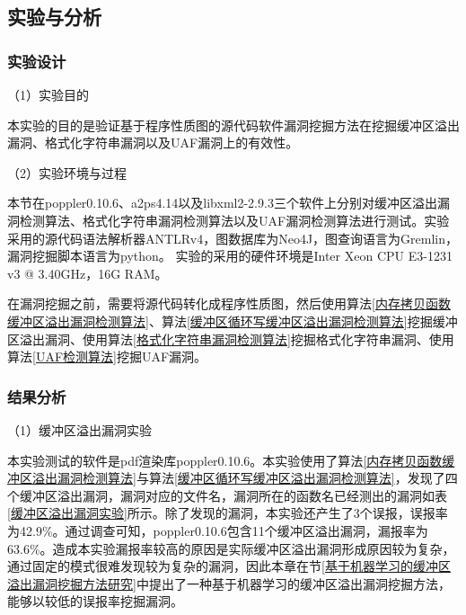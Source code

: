 {%

\subsection{实验与分析}

\subsubsection{实验设计}
（1）实验目的

本实验的目的是验证基于程序性质图的源代码软件漏洞挖掘方法在挖掘缓冲区溢出漏洞、格式化字符串漏洞以及UAF漏洞上的有效性。

（2）实验环境与过程

本节在poppler0.10.6、a2ps4.14以及libxml2-2.9.3三个软件上分别对缓冲区溢出漏洞检测算法、格式化字符串漏洞检测算法以及UAF漏洞检测算法进行测试。实验采用的源代码语法解析器ANTLRv4，图数据库为Neo4J，图查询语言为Gremlin，漏洞挖掘脚本语言为python。
实验的采用的硬件环境是Inter Xeon CPU E3-1231 v3 @ 3.40GHz，16G RAM。

在漏洞挖掘之前，需要将源代码转化成程序性质图，然后使用算法\ref{内存拷贝函数缓冲区溢出漏洞检测算法}、算法\ref{缓冲区循环写缓冲区溢出漏洞检测算法}挖掘缓冲区溢出漏洞、使用算法\ref{格式化字符串漏洞检测算法}挖掘格式化字符串漏洞、使用算法\ref{UAF检测算法}挖掘UAF漏洞。

\subsubsection{结果分析}

（1）缓冲区溢出漏洞实验

本实验测试的软件是pdf渲染库poppler0.10.6。本实验使用了算法\ref{内存拷贝函数缓冲区溢出漏洞检测算法}与算法\ref{缓冲区循环写缓冲区溢出漏洞检测算法}，发现了四个缓冲区溢出漏洞，漏洞对应的文件名，漏洞所在的函数名已经测出的漏洞如表\ref{缓冲区溢出漏洞实验}所示。除了发现的漏洞，本实验还产生了3个误报，误报率为42.9\%。通过调查可知，poppler0.10.6包含11个缓冲区溢出漏洞，漏报率为63.6\%。造成本实验漏报率较高的原因是实际缓冲区溢出漏洞形成原因较为复杂，通过固定的模式很难发现较为复杂的漏洞，因此本章在节\ref{基于机器学习的缓冲区溢出漏洞挖掘方法研究}中提出了一种基于机器学习的缓冲区溢出漏洞挖掘方法，能够以较低的误报率挖掘漏洞。

}
